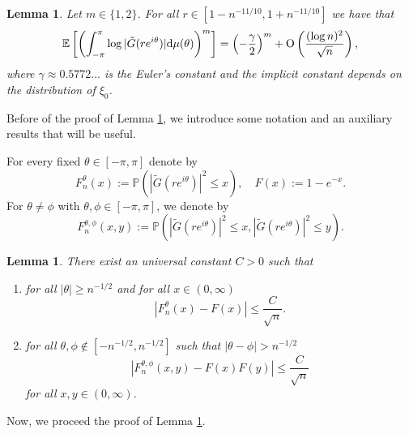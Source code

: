 \documentclass[12pt]{amsart}
\theoremstyle{plain}
\numberwithin{equation}{section}
\newtheorem{lemma}[theorem]{Lemma}
\renewcommand{\Pr}{\mathbb{P}}
\newcommand{\<}{\langle}
\renewcommand{\>}{\rangle}
\newcommand{\PP}[1]{\left(#1\right)}
\newcommand{\abs}[1]{\left|#1\right|}
\renewcommand{\Pr}[1]{\mathds{P}\left(#1\right)}
\begin{document}
\begin{lemma}\label{lem:expectation} Let $m\in\{1,2\}$. For all $r\in [1-n^{-11/10},1+n^{-11/10}]$ we have that 
\[
\mathbb{E} \left[ \left( \int_{ -\pi}^{\pi} \log |\tilde{G}(re^{i\theta})| \textnormal{d}\mu(\theta) \right)^m \right] = \left( -\frac{\gamma}{2} \right)^m +  \textnormal{O}\PP{\frac{(\log n)^2 }{\sqrt{n}}},
\]
where $\gamma \approx 0.5772...$ is the Euler's constant and the implicit constant depends on the distribution of $\xi_0$.
\end{lemma}

Before of the proof of Lemma \ref{lem:expectation}, we introduce some notation and an auxiliary results that will be useful.

For every fixed $\theta\in[-\pi,\pi]$ denote by
\[
F^{\theta}_n(x) := \Pr{ \abs{\tilde{G}(re^{i\theta})}^2 \leq x }, \quad F(x) := 1 - e^{-x}.
\]
For $\theta\neq \phi$ with $\theta,\phi\in [-\pi,\pi]$, we denote by
\[
F_{n}^{\theta,\phi}(x,y) := \Pr{ \abs{\tilde{G}(re^{i\theta})}^2 \leq x, \abs{\tilde{G}(re^{i\theta})}^2 \leq y }.
\]

\begin{lemma}\label{lem:dist_approx} There exist an universal constant $C>0$ such that

\begin{enumerate}
\item for all $\abs{\theta} \geq n^{-1/2}$ and for all $x\in(0,\infty)$ \[ \abs{F_{n}^{\theta}(x) - F(x)} \leq \frac{C}{\sqrt{n}}.\]
\item for all $\theta,\phi \not\in [-n^{-1/2},n^{-1/2}]$ such that $\abs{\theta - \phi} > n^{-1/2}$ \[ \abs{F_{n}^{\theta,\phi}(x,y) - F(x)F(y)} \leq \frac{C}{\sqrt{n}}\] for all $x,y\in(0,\infty)$.
\end{enumerate}
\end{lemma} 

Now, we proceed the proof of Lemma \ref{lem:expectation}.
\end{document}
